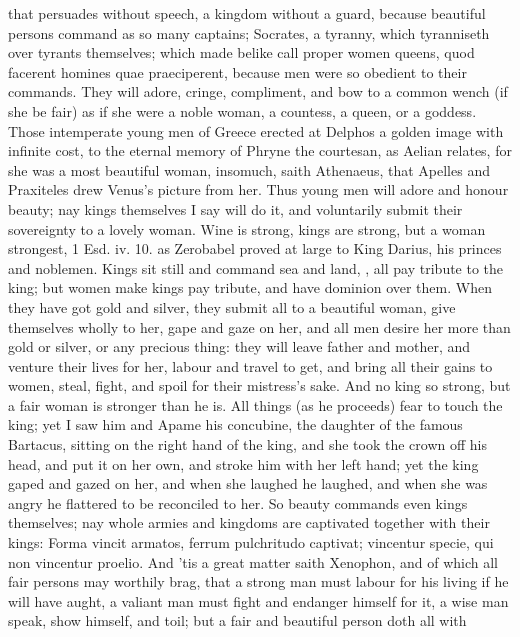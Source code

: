 that persuades without speech, a kingdom without a guard, because
beautiful persons command as so many captains; Socrates, a tyranny,
which tyranniseth over tyrants themselves; which made \Diogenes belike
call proper women queens, quod facerent homines quae praeciperent,
because men were so obedient to their commands. They will adore,
cringe, compliment, and bow to a common wench (if she be fair) as if
she were a noble woman, a countess, a queen, or a goddess. Those
intemperate young men of Greece erected at Delphos a golden image with
infinite cost, to the eternal memory of Phryne the courtesan, as Aelian
relates, for she was a most beautiful woman, insomuch, saith
Athenaeus, that Apelles and Praxiteles drew Venus's picture from
her. Thus young men will adore and honour beauty; nay kings themselves
I say will do it, and voluntarily submit their sovereignty to a lovely
woman. Wine is strong, kings are strong, but a woman strongest, 1 Esd.
iv. 10. as Zerobabel proved at large to King Darius, his princes and
noblemen. Kings sit still and command sea and land, \etc{}, all pay
tribute to the king; but women make kings pay tribute, and have
dominion over them. When they have got gold and silver, they submit all
to a beautiful woman, give themselves wholly to her, gape and gaze on
her, and all men desire her more than gold or silver, or any precious
thing: they will leave father and mother, and venture their lives for
her, labour and travel to get, and bring all their gains to women,
steal, fight, and spoil for their mistress's sake. And no king so
strong, but a fair woman is stronger than he is. All things (as
he proceeds) fear to touch the king; yet I saw him and Apame his
concubine, the daughter of the famous Bartacus, sitting on the right
hand of the king, and she took the crown off his head, and put it on
her own, and stroke him with her left hand; yet the king gaped and
gazed on her, and when she laughed he laughed, and when she was angry
he flattered to be reconciled to her. So beauty commands even kings
themselves; nay whole armies and kingdoms are captivated together with
their kings: Forma vincit armatos, ferrum pulchritudo captivat;
vincentur specie, qui non vincentur proelio. And 'tis a great matter
saith Xenophon, and of which all fair persons may worthily brag,
that a strong man must labour for his living if he will have aught, a
valiant man must fight and endanger himself for it, a wise man speak,
show himself, and toil; but a fair and beautiful person doth all with
